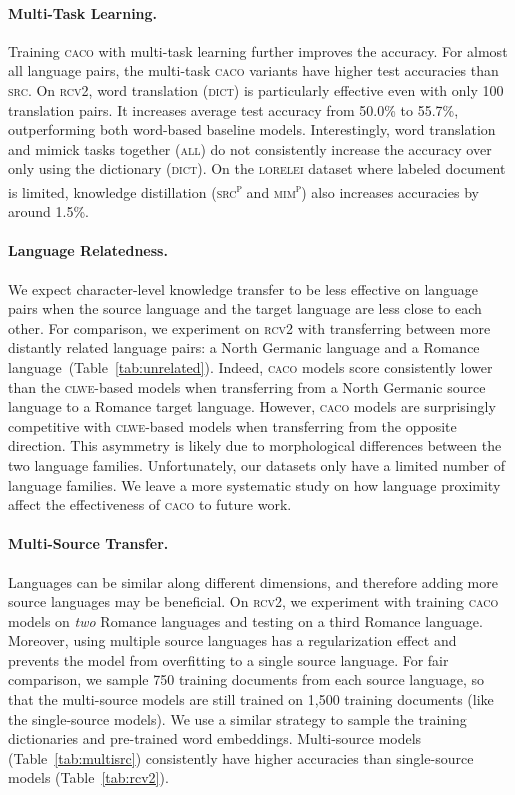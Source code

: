 \documentclass[letterpaper]{article} %
\newcommand{\abr}[1]{\textsc{#1}}
\newcommand{\name}[0]{\textsc{caco}}
\newcommand{\pp}[0]{\textsuperscript{p}}
\begin{document}
\paragraph{Multi-Task Learning.}
Training \name{} with multi-task learning further improves the accuracy.  For
almost all language pairs, the multi-task \name{} variants have higher test
accuracies than \abr{src}.
On \abr{rcv2}, word translation (\abr{dict}) is particularly effective even
with only 100 translation pairs.
It increases average test accuracy from 50.0\% to 55.7\%, outperforming both
word-based baseline models.
Interestingly, word translation and mimick tasks together (\abr{all}) do not
consistently increase the accuracy over only using the dictionary (\abr{dict}).
On the \abr{lorelei} dataset where labeled document is limited, knowledge
distillation (\abr{src\pp{}} and \abr{mim\pp{}}) also increases
accuracies by around 1.5\%.

\paragraph{Language Relatedness.}
We expect character-level knowledge transfer to be less effective on language
pairs when the source language and the target language are less close to each
other.
For comparison, we experiment on \abr{rcv2} with transferring between more
distantly related language pairs: a North Germanic language and a Romance
language~(Table~\ref{tab:unrelated}).
Indeed, \name{} models score consistently
lower than the \abr{clwe}-based models when transferring from a North Germanic
source language to a Romance target language.  However, \name{} models are
surprisingly competitive with \abr{clwe}-based models when transferring from
the opposite direction.  This asymmetry is likely due to morphological
differences between the two language families.
Unfortunately, our datasets only have a limited number of language families.
We leave a more systematic study on how language proximity affect the
effectiveness of \name{} to future work.

\paragraph{Multi-Source Transfer.}
Languages can be similar along different dimensions, and therefore adding more
source languages may be beneficial.
On \abr{rcv2}, we experiment with training \name{} models on \emph{two} Romance
languages and testing on a third Romance language.
Moreover, using multiple source languages has a regularization
effect and prevents the model from overfitting to a single source language.
For fair comparison, we sample 750 training documents from each source
language, so that the multi-source models are still trained on 1,500 training
documents (like the single-source models).  We use a similar strategy to sample
the training dictionaries and pre-trained word embeddings.  Multi-source models
(Table~\ref{tab:multisrc}) consistently have higher accuracies than single-source models
(Table~\ref{tab:rcv2}).
\end{document}
